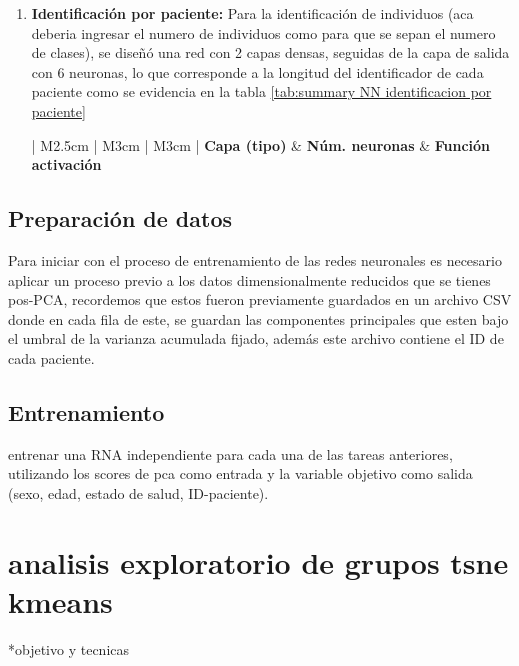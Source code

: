 \documentclass[12pt,letterpaper,oneside,openright]{book}
\begin{document}
\begin{enumerate}
	\item \textbf{Identificación por paciente:} Para la identificación de individuos (aca deberia ingresar el numero de individuos como para que se sepan el numero de clases), se diseñó una red con 2 capas densas, seguidas de la capa de salida con 6 neuronas, lo que corresponde a la longitud del identificador de cada paciente como se evidencia en la tabla \ref{tab:summary NN identificacion por paciente}
	\begin{table}[h]
		\begin{center}
			\begin{tabular}{| M{2.5cm} | M{3cm} | M{3cm} |}
				\hline
				\textbf{Capa (tipo)} & \textbf{Núm. neuronas} & \textbf{Función activación} \\ 
				\hline
			\end{tabular}
		\end{center}
		\caption{Texto del cuadro identificación por paciente}
		\label{tab:summary NN identificacion por paciente}
	\end{table}
\end{enumerate}

\subsection{Preparación de datos}

Para iniciar con el proceso de entrenamiento de las redes neuronales es necesario aplicar un proceso previo a los datos dimensionalmente reducidos que se tienes pos-PCA, recordemos que estos fueron previamente guardados en un archivo CSV donde en cada fila de este, se guardan las componentes principales que esten bajo el umbral de la varianza acumulada fijado, además este archivo contiene el ID de cada paciente. %

\subsection{Entrenamiento} entrenar una RNA independiente para cada una de las tareas anteriores, utilizando los scores de pca como entrada y la variable objetivo como salida (sexo, edad, estado de salud, ID-paciente).


\section{analisis exploratorio de grupos tsne kmeans}
*objetivo y tecnicas
\end{document}
